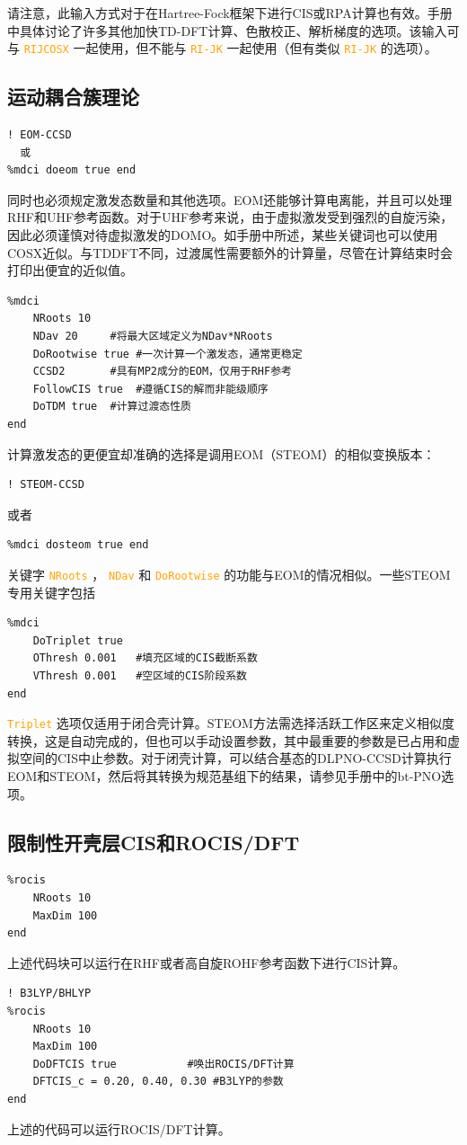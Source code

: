 \documentclass{ctexart}
\newcommand{\cmd}[1]{\textcolor{orange}{ \texttt{#1} }}
\begin{document}
	请注意，此输入方式对于在Hartree-Fock框架下进行CIS或RPA计算也有效。手册中具体讨论了许多其他加快TD-DFT计算、色散校正、解析梯度的选项。该输入可与\cmd{RIJCOSX}一起使用，但不能与\cmd{RI-JK}一起使用（但有类似\cmd{RI-JK}的选项）。
	
	\subsection{运动耦合簇理论} 
	\begin{lstlisting}
! EOM-CCSD
  或
%mdci doeom true end
	\end{lstlisting}
	
	同时也必须规定激发态数量和其他选项。EOM还能够计算电离能，并且可以处理RHF和UHF参考函数。对于UHF参考来说，由于虚拟激发受到强烈的自旋污染，因此必须谨慎对待虚拟激发的DOMO。如手册中所述，某些关键词也可以使用COSX近似。与TDDFT不同，过渡属性需要额外的计算量，尽管在计算结束时会打印出便宜的近似值。
	\begin{lstlisting}
%mdci	
	NRoots 10
	NDav 20		#将最大区域定义为NDav*NRoots
	DoRootwise true	#一次计算一个激发态，通常更稳定
	CCSD2		#具有MP2成分的EOM，仅用于RHF参考 
	FollowCIS true	#遵循CIS的解而非能级顺序
	DoTDM true	#计算过渡态性质
end
	\end{lstlisting}
	
	计算激发态的更便宜却准确的选择是调用EOM（STEOM）的相似变换版本：
	\begin{lstlisting}
! STEOM-CCSD
	\end{lstlisting}
	或者
	\begin{lstlisting}
%mdci dosteom true end
	\end{lstlisting}
	关键字\cmd{NRoots}，\cmd{NDav}和\cmd{DoRootwise}的功能与EOM的情况相似。一些STEOM专用关键字包括
	\begin{lstlisting}
%mdci	
	DoTriplet true	 
	OThresh 0.001	#填充区域的CIS截断系数
	VThresh 0.001	#空区域的CIS阶段系数
end
	\end{lstlisting}
	
	\cmd{Triplet}选项仅适用于闭合壳计算。STEOM方法需选择活跃工作区来定义相似度转换，这是自动完成的，但也可以手动设置参数，其中最重要的参数是已占用和虚拟空间的CIS中止参数。对于闭壳计算，可以结合基态的DLPNO-CCSD计算执行EOM和STEOM，然后将其转换为规范基组下的结果，请参见手册中的bt-PNO选项。
	
	\subsection{限制性开壳层CIS和ROCIS/DFT} 
	\begin{lstlisting}
%rocis 
	NRoots 10
	MaxDim 100
end
	\end{lstlisting}
	上述代码块可以运行在RHF或者高自旋ROHF参考函数下进行CIS计算。
	\begin{lstlisting}
! B3LYP/BHLYP
%rocis 
	NRoots 10
	MaxDim 100
	DoDFTCIS true			#唤出ROCIS/DFT计算
	DFTCIS_c = 0.20, 0.40, 0.30	#B3LYP的参数
end
	\end{lstlisting}
	上述的代码可以运行ROCIS/DFT计算。
	
\end{document}
